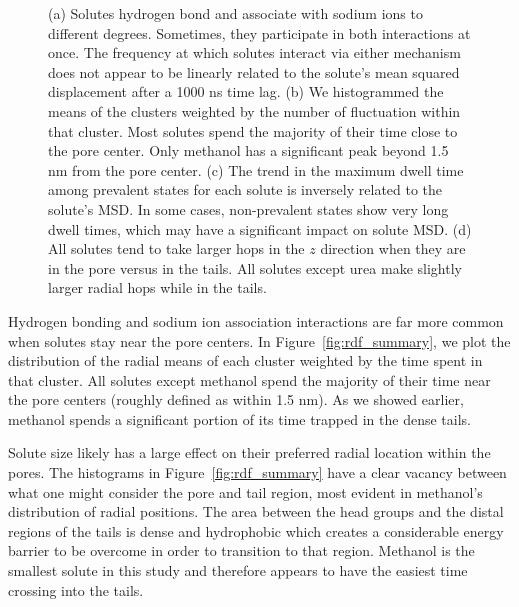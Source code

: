 \documentclass[journal=jpcbfk,manuscript=article]{achemso}
\begin{document}
\begin{figure}
  \caption{(a) Solutes hydrogen bond and associate with sodium ions
  to different degrees. Sometimes, they participate in both interactions at
  once. The frequency at which solutes interact via either mechanism does
  not appear to be linearly related to the solute's mean squared displacement
  after a 1000 ns time lag. (b) We histogrammed the means of the clusters weighted
  by the number of fluctuation within that cluster. Most solutes spend the majority of
  their time close to the pore center. Only methanol has a significant peak
  beyond 1.5 nm from the pore center. (c) The trend in the maximum dwell time
  among prevalent states for each solute is inversely related to the
  solute's MSD. In some cases, non-prevalent states show very long dwell times,
  which may have a significant impact on solute MSD. (d) All solutes tend to
  take larger hops in the $z$ direction when they are in the pore versus in 
  the tails. All solutes except urea make slightly larger radial hops while 
  in the tails.
  }\label{fig:summaries}
  \end{figure}
  
  Hydrogen bonding and sodium ion association interactions are far more 
  common when solutes stay near the pore centers. In Figure~\ref{fig:rdf_summary},
  we plot the distribution of the radial means of each cluster weighted by 
  the time spent in that cluster. All solutes except methanol spend the 
  majority of their time near the pore centers (roughly defined as within 
  1.5 nm). As we showed earlier, methanol spends a significant portion of its
  time trapped in the dense tails.
  
  Solute size likely has a large effect on their preferred radial location within
  the pores. The histograms in Figure~\ref{fig:rdf_summary} have a clear vacancy 
  between what one might consider the pore and tail region, most evident in methanol's 
  distribution of radial positions. The area between the head groups and the distal
  regions of the tails is dense and hydrophobic which creates a considerable energy 
  barrier to be overcome in order to transition to that region.
  Methanol is the smallest solute in this study and therefore appears to 
  have the easiest time crossing into the tails.
\end{document}
